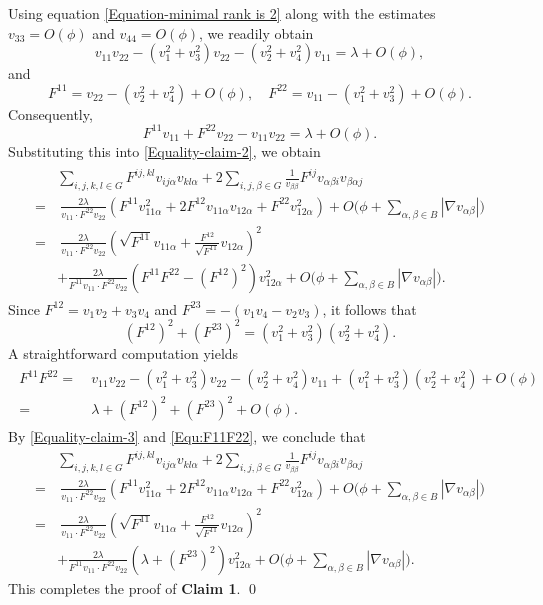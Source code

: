 \documentclass[11pt]{amsart}
\numberwithin{theorem}{section}
\numberwithin{equation}{section}
\begin{document}
Using equation \eqref{Equation-minimal rank is 2} along with the estimates $v_{33}=O(\phi)$ and $v_{44}=O(\phi)$, we readily obtain $$v_{11}v_{22}-(v_1^2+v_3^2)v_{22}-(v_2^2+v_4^2)v_{11}=\lambda+O(\phi), $$ and $$F^{11}=v_{22}-(v_2^2+v_4^2)+O(\phi), \quad F^{22}=v_{11}-(v_1^2+v_3^2)+O(\phi). $$ Consequently, $$F^{11}v_{11}+F^{22}v_{22}-v_{11}v_{22}=\lambda+O(\phi). $$ Substituting this into \eqref{Equality-claim-2}, we obtain
\begin{align}\label{Equality-claim-3}
\begin{split}
&\sum_{i,j,k,l\in G}F^{ij,kl}v_{ij\alpha}v_{kl\alpha}+2\sum_{i,j,\beta\in G}\frac{1}{v_{\beta\beta}}F^{ij}v_{\alpha\beta i}v_{\beta\alpha j}\\
=&~\frac{2\lambda}{v_{11}\cdot F^{22}v_{22}}\left(F^{11}v_{11\alpha}^2+2F^{12}v_{11\alpha}v_{12\alpha}+F^{22}v_{12\alpha}^2\right)+O\bigg(\phi+\sum_{\alpha,\beta\in B}|\nabla v_{\alpha\beta}|\bigg)\\
=&~\frac{2\lambda}{v_{11}\cdot F^{22}v_{22}}\left(\sqrt{F^{11}}v_{11\alpha}+\frac{F^{12}}{\sqrt{F^{11}}}v_{12\alpha}\right)^2\\
&+\frac{2\lambda}{F^{11}v_{11}\cdot F^{22}v_{22}}\left(F^{11}F^{22}-(F^{12})^2\right)v_{12\alpha}^2+O\bigg(\phi+\sum_{\alpha,\beta\in B}|\nabla v_{\alpha\beta}|\bigg).
\end{split}
\end{align}
Since $F^{12}=v_1v_2+v_3v_4$ and $F^{23}=-(v_1v_4-v_2v_3)$, it follows that $$(F^{12})^2+(F^{23})^2=(v_1^2+v_3^2)(v_2^2+v_4^2). $$ A straightforward computation yields
\begin{align}\label{Equ:F11F22}
\begin{split}
F^{11}F^{22}=&~v_{11}v_{22}-(v_1^2+v_3^2)v_{22}-(v_2^2+v_4^2)v_{11}+(v_1^2+v_3^2)(v_2^2+v_4^2)+O(\phi)\\
=&~\lambda+(F^{12})^2+(F^{23})^2+O(\phi).
\end{split}
\end{align}
By \eqref{Equality-claim-3} and \eqref{Equ:F11F22}, we conclude that
\begin{align*}
&\sum_{i,j,k,l\in G}F^{ij,kl}v_{ij\alpha}v_{kl\alpha}+2\sum_{i,j,\beta\in G}\frac{1}{v_{\beta\beta}}F^{ij}v_{\alpha\beta i}v_{\beta\alpha j}\\
=&~\frac{2\lambda}{v_{11}\cdot F^{22}v_{22}}\left(F^{11}v_{11\alpha}^2+2F^{12}v_{11\alpha}v_{12\alpha}+F^{22}v_{12\alpha}^2\right)+O\bigg(\phi+\sum_{\alpha,\beta\in B}|\nabla v_{\alpha\beta}|\bigg)\\
=&~\frac{2\lambda}{v_{11}\cdot F^{22}v_{22}}\left(\sqrt{F^{11}}v_{11\alpha}+\frac{F^{12}}{\sqrt{F^{11}}}v_{12\alpha}\right)^2\\
&+\frac{2\lambda}{F^{11}v_{11}\cdot F^{22}v_{22}}\left(\lambda+(F^{23})^2\right)v_{12\alpha}^2+O\bigg(\phi+\sum_{\alpha,\beta\in B}|\nabla v_{\alpha\beta}|\bigg).
\end{align*}
This completes the proof of \textbf{Claim 1}. \qed
\end{document}
